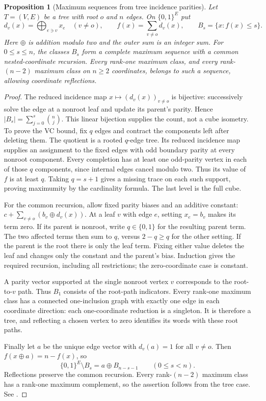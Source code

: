 \documentclass[11pt]{article}
\newtheorem{proposition}{Proposition}[section]
\theoremstyle{definition}
\newcommand{\bits}{\{0,1\}}
\begin{document}
\begin{proposition}[Maximum sequences from tree incidence parities]
\label{prop:tree-parity-flags}
Let $T=(V,E)$ be a tree with root $o$ and $n$ edges. On $\bits^E$ put
\[
 d_v(x)=\bigoplus_{e\ni v}x_e\quad(v\ne o),\qquad
 f(x)=\sum_{v\ne o}d_v(x),\qquad B_s=\{x:f(x)\le s\}.
\]
Here $\oplus$ is addition modulo two and the outer sum is an integer sum.
For $0\le s\le n$, the classes $B_s$ form a complete maximum sequence
with a common nested-coordinate recursion. Every rank-one maximum class,
and every rank-$(n-2)$ maximum class on $n\ge2$ coordinates, belongs to
such a sequence, allowing coordinate reflections.
\end{proposition}
\begin{proof}
The reduced incidence map $x\mapsto(d_v(x))_{v\ne o}$ is bijective:
successively solve the edge at a nonroot leaf and update its parent's parity.
Hence $|B_s|=\sum_{j=0}^s\binom nj$. This linear bijection supplies the
count, not a cube isometry. To prove the VC bound, fix $q$ edges and
contract the components left after deleting them. The quotient is a rooted
$q$-edge tree. Its reduced incidence map supplies an assignment to the fixed
edges with odd boundary parity at every nonroot component. Every completion
has at least one odd-parity vertex in each of those $q$ components, since
internal edges cancel modulo two. Thus its value of $f$ is at least $q$.
Taking $q=s+1$ gives a missing trace on each such support, proving
maximumity by the cardinality formula. The last level is the full cube.

For the common recursion, allow fixed parity biases and an additive constant:
$c+\sum_{v\ne o}(b_v\mathbin\oplus d_v(x))$.
At a leaf $v$ with edge $e$, setting $x_e=b_v$ makes its term zero.
If its parent is nonroot, write $q\in\{0,1\}$ for the resulting parent
term. The two affected terms then sum to $q$, versus $2-q\ge q$ for
the other setting. If the parent is the root there is only the leaf term.
Fixing either value deletes the leaf and changes only the constant and the
parent's bias. Induction gives the required recursion, including all
restrictions; the zero-coordinate case is constant.

A parity vector supported at the single nonroot vertex $v$ corresponds
to the root-to-$v$ path. Thus $B_1$ consists of the root-path indicators.
Every rank-one maximum class has a connected one-inclusion graph with
exactly one edge in each coordinate direction: each one-coordinate reduction
is a singleton. It is therefore a tree, and reflecting a chosen vertex to
zero identifies its words with these root paths.

Finally let $a$ be the unique edge vector with $d_v(a)=1$ for all
$v\ne o$. Then $f(x\mathbin\oplus a)=n-f(x)$, so
\[
 \bits^E\setminus B_s=a\mathbin\oplus B_{n-s-1}\qquad(0\le s<n).
\]
Reflections preserve the common recursion. Every rank-$(n-2)$ maximum
class has a rank-one maximum complement, so the assertion follows from
the tree case. See \cite{Structural987}.
\end{proof}
\end{document}
